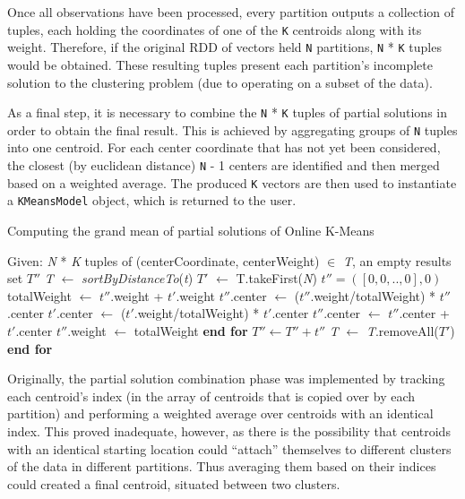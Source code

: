 \documentclass{l4proj}
\begin{document}
Once all observations have been processed, every partition outputs a collection of tuples, each holding the coordinates of one of the \texttt{K} centroids along with its weight. Therefore, if the original RDD of vectors held \texttt{N} partitions, \texttt{N} * \texttt{K} tuples would be obtained. These resulting tuples present each partition's incomplete solution to the clustering problem (due to operating on a subset of the data).

As a final step, it is necessary to combine the \texttt{N} * \texttt{K} tuples of partial solutions in order to obtain the final result. This is achieved by aggregating groups of \texttt{N} tuples into one centroid. For each center coordinate that has not yet been considered, the closest (by euclidean distance) \texttt{N} - 1 centers are identified and then merged based on a weighted average. The produced \texttt{K} vectors are then used to instantiate a \texttt{KMeansModel} object, which is returned to the user.

\begin{algorithm}[H]
\caption{Computing the grand mean of partial solutions of Online K-Means}\label{online-merge}
\begin{algorithmic}[1]
\State Given: \textit{N} * \textit{K} tuples of (centerCoordinate, centerWeight) $\in$ \textit{T}, an empty results set $T''$ 
    \State \textit{T}  $\gets$ \textit{sortByDistanceTo}(\textit{t})
    \State $T'$ $\gets$ T.takeFirst(\textit{N})
    \State $t'' = ([0 ,0, .., 0], 0)$
    	\State totalWeight $\gets$ $t''$.weight + $t'$.weight
        \State $t''$.center $\gets$ ($t''$.weight/totalWeight) * $t''$.center
        \State $t'$.center $\gets$ ($t'$.weight/totalWeight) * $t'$.center
        \State $t''$.center $\gets$ $t''$.center + $t'$.center
        \State $t''$.weight $\gets$ totalWeight
    \EndFor
    \State \textbf{end for}
    \State $T'' \gets T'' + t''$
    \State \textit{T} $\gets$ \textit{T}.removeAll($T'$)
\EndFor
\State \textbf{end for}
\end{algorithmic}
\end{algorithm}

Originally, the partial solution combination phase was implemented by tracking each centroid's index (in the array of centroids that is copied over by each partition) and performing a weighted average over centroids with an identical index. This proved inadequate, however, as there is the possibility that centroids with an identical starting location could ``attach'' themselves to different clusters of the data in different partitions. Thus averaging them based on their indices could created a final centroid, situated between two clusters.
\end{document}
